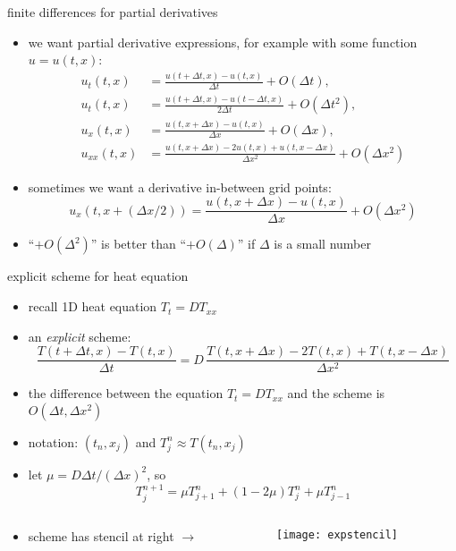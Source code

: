 \begin{frame}{finite differences for partial derivatives}

\begin{itemize}
\item we want partial derivative expressions, for example with some function $u=u(t,x)$:
\small
\begin{align*}
u_t(t,x) &= \frac{u(t+\Delta t,x) - u(t,x)}{\Delta t} + O(\Delta t), \\
u_t(t,x) &= \frac{u(t+\Delta t,x) - u(t-\Delta t,x)}{2\Delta t} + O(\Delta t^2), \\
u_x(t,x) &= \frac{u(t,x+\Delta x) - u(t,x)}{\Delta x} + O(\Delta x), \\
u_{xx}(t,x) &= \frac{u(t,x+\Delta x) - 2 u(t,x) + u(t,x-\Delta x)}{\Delta x^2} + O(\Delta x^2)
\end{align*}
\normalsize
\item sometimes we want a derivative in-between grid points:
\small
	$$u_x(t,x+(\Delta x/2)) = \frac{u(t,x+\Delta x) - u(t,x)}{\Delta x} + O(\Delta x^2)$$
\normalsize
\item ``$+O(\Delta^2)$'' is better than ``$+O(\Delta)$'' if $\Delta$ is a small number
\end{itemize}
\end{frame}


\begin{frame}{explicit scheme for heat equation}
\label{slide:explicit}

\begin{itemize}
\item recall 1D heat equation $T_t = D T_{xx}$
\item an \emph{explicit} scheme:
\small
	$$\frac{T(t+\Delta t,x) - T(t,x)}{\Delta t} = D\,\frac{T(t,x+\Delta x) - 2 T(t,x) + T(t,x-\Delta x)}{\Delta x^2}$$
\normalsize
\item the difference between the equation $T_t = D T_{xx}$ and the scheme is $O(\Delta t,\Delta x^2)$
\item notation: $(t_n,x_j)$ and $T_j^n \approx T(t_n,x_j)$
\item let $\mu = D \Delta t / (\Delta x)^2$, so
\small
	$$T_j^{n+1} = \mu T_{j+1}^n + (1 - 2 \mu) T_j^n + \mu T_{j-1}^n$$
\normalsize
\end{itemize}
\begin{columns}
\begin{column}{0.55\textwidth}
\begin{itemize}
\item scheme has stencil at right \large $\to$ \normalsize
\end{itemize}
\end{column}
\begin{column}{0.45\textwidth}
\texttt{[image: expstencil]}
\end{column}
\end{columns}
\end{frame}



